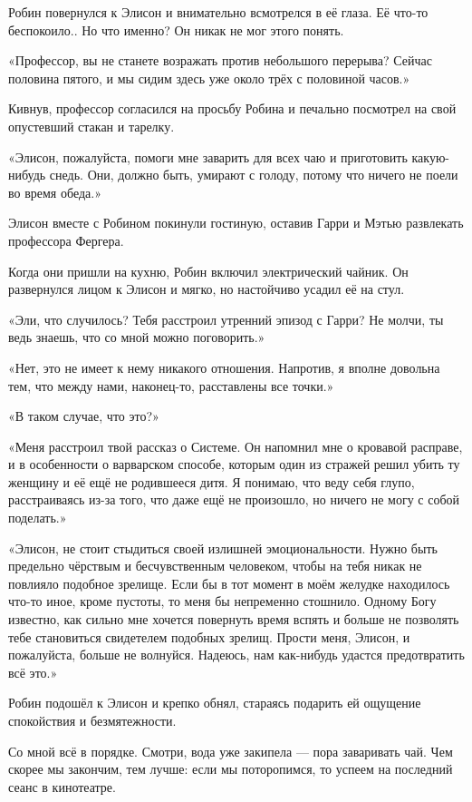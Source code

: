 \documentclass[a4paper,12pt]{book}
\begin{document}
\par
Робин повернулся к Элисон и внимательно всмотрелся в её глаза. Её что-то беспокоило.. Но что именно? Он никак не мог этого понять.
\par
«Профессор, вы не станете возражать против небольшого перерыва? Сейчас половина пятого, и мы сидим здесь уже около трёх с половиной часов.»
\par
Кивнув, профессор согласился на просьбу Робина и печально посмотрел на свой опустевший стакан и тарелку.
\par
«Элисон, пожалуйста, помоги мне заварить для всех чаю и приготовить какую-нибудь снедь. Они, должно быть, умирают с голоду, потому что ничего не поели во время обеда.»
\par
Элисон вместе с Робином покинули гостиную, оставив Гарри и Мэтью развлекать профессора Фергера.
\par
Когда они пришли на кухню, Робин включил электрический чайник. Он развернулся лицом к Элисон и мягко, но настойчиво усадил её на стул.
\par
«Эли, что случилось? Тебя расстроил утренний эпизод с Гарри? Не молчи, ты ведь знаешь, что со мной можно поговорить.»
\par
«Нет, это не имеет к нему никакого отношения. Напротив, я вполне довольна тем, что между нами, наконец-то, расставлены все точки.»
\par
«В таком случае, что это?»
\par
«Меня расстроил твой рассказ о Системе. Он напомнил мне о кровавой расправе, и в особенности о варварском способе, которым один из стражей решил убить ту женщину и её ещё не родившееся дитя. Я понимаю, что веду себя глупо, расстраиваясь из-за того, что даже ещё не произошло, но ничего не могу с собой поделать.»
\par
«Элисон, не стоит стыдиться своей излишней эмоциональности. Нужно быть предельно чёрствым и бесчувственным человеком, чтобы на тебя никак не повлияло подобное зрелище. Если бы в тот момент в моём желудке находилось что-то иное, кроме пустоты, то меня бы непременно стошнило. Одному Богу известно, как сильно мне хочется повернуть время вспять и больше не позволять тебе становиться свидетелем подобных зрелищ. Прости меня, Элисон, и пожалуйста, больше не волнуйся. Надеюсь, нам как-нибудь удастся предотвратить всё это.»
\par
Робин подошёл к Элисон и крепко обнял, стараясь подарить ей ощущение спокойствия и безмятежности.
\par
Со мной всё в порядке. Смотри, вода уже закипела — пора заваривать чай. Чем скорее мы закончим, тем лучше: если мы поторопимся, то успеем на последний сеанс в кинотеатре.
\end{document}
